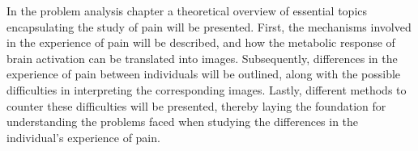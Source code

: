 
In the problem analysis chapter a theoretical overview of essential topics encapsulating the study of pain will be presented. First, the mechanisms involved in the experience of pain will be described, and how the metabolic response of brain activation can be translated into images. Subsequently, differences in the experience of pain between individuals will be outlined, along with the possible difficulties in interpreting the corresponding images. Lastly, different methods to counter these difficulties will be presented, thereby laying the foundation for understanding the problems faced when studying the differences in the individual’s experience of pain. 